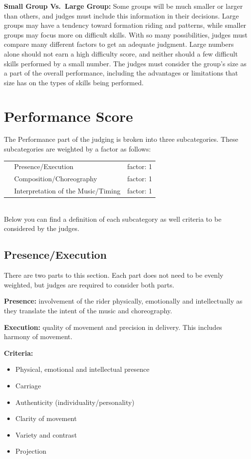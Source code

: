 \textbf{Small Group Vs.\ Large Group:} Some groups will be much smaller or larger than others, and judges must include this information in their decisions.
Large groups may have a tendency toward formation riding and patterns, while smaller groups may focus more on difficult skills.
With so many possibilities, judges must compare many different factors to get an adequate judgment.
Large numbers alone should not earn a high difficulty score, and neither should a few difficult skills performed by a small number.
The judges must consider the group's size as a part of the overall performance, including the advantages or limitations that size has on the types of skills being performed.

\section{Performance Score \label{sec:freestyle_performance-score}}
The Performance part of the judging is broken into three subcategories.
These subcategories are weighted by a factor as follows:

\begin{tabular}{l l l}
 & Presence/Execution & factor: 1 \\
 & Composition/Choreography & factor: 1 \\
 & Interpretation of the Music/Timing & factor: 1 \\
\end{tabular}\\

Below you can find a definition of each subcategory as well criteria to be considered by the judges.

\subsection{Presence/Execution}
There are two parts to this section.
Each part does not need to be evenly weighted, but judges are required to consider both parts.

\textbf{Presence:} involvement of the rider physically, emotionally and intellectually as they translate the intent of the music and choreography.

\textbf{Execution:} quality of movement and precision in delivery.
This includes harmony of movement.

\textbf{Criteria:}
\begin{itemize}
\item Physical, emotional and intellectual presence
\item Carriage
\item Authenticity (individuality/personality)
\item Clarity of movement
\item Variety and contrast
\item Projection
\end{itemize}

